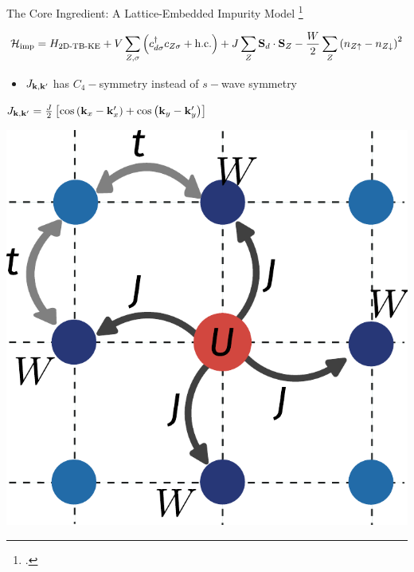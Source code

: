 \documentclass[10pt,aspectratio=169]{beamer}
\begin{document}
\begin{frame}{The Core Ingredient: A Lattice-Embedded Impurity Model}
	\footcite{Yang2002}
\begin{minipage}{0.75\textwidth}
	\vspace{-10pt}
	\[\mathcal{H}_\text{imp} = H_\text{2D-TB-KE} + V\sum_{Z,\sigma} \left(c^\dagger_{d\sigma}c_{Z\sigma} + \text{h.c.}\right) + J\sum_{Z} {\bf S}_d\cdot {\bf S}_Z -\frac{W}{2}\sum_{Z} \left(n_{Z\uparrow} - n_{Z\downarrow}\right)^2\]
	\vspace{-10pt}
	\begin{itemize}
		\item \(J_{{\bf k}, {\bf k}^\prime}\) has \alert{\(C_4-\)symmetry} instead of \(s-\)wave symmetry
	\end{itemize}
	\(J_{{\bf k}, {\bf k}^\prime} = \frac{J}{2}\left[\cos\left({\bf k}_x - {\bf k}^\prime_x\right) + \cos\left({\bf k}_y - {\bf k}^\prime_y\right)\right]\)
\end{minipage}
\begin{minipage}{0.2\textwidth}
	\includegraphics[width=\textwidth]{pWaveEsiam.pdf}
\end{minipage}

\vspace{10pt}
\end{frame}
\end{document}
